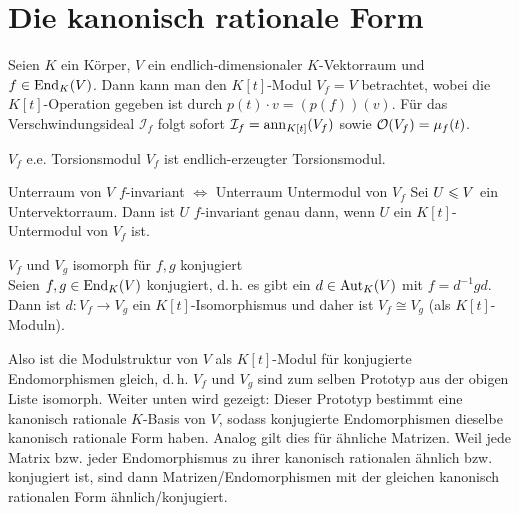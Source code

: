 \section{%
    Die kanonisch rationale Form%
}

\begin{Bem}
    Seien $K$ ein Körper, $V$ ein endlich-dimensionaler $K$-Vektorraum und
    $f \in \operatorname{End}_K(V)$.
    Dann kann man den $K[t]$-Modul $V_f = V$ betrachtet, wobei die
    $K[t]$-Operation gegeben ist durch $p(t) \cdot v = (p(f))(v)$.
    Für das Verschwindungsideal $\mathcal{I}_f$ folgt sofort
    $\mathcal{I}_f = \operatorname{ann}_{K[t]}(V_f)$ sowie $\mathcal{O}(V_f) = \mu_f(t)$.
\end{Bem}

\begin{Lemma}{$V_f$ e.e. Torsionsmodul}
    $V_f$ ist endlich-erzeugter Torsionsmodul.
\end{Lemma}

\begin{Lemma}{Unterraum von $V$ $f$-invariant $\Leftrightarrow$
              Unterraum Untermodul von $V_f$}
    Sei $U \leqslant V$ ein Untervektorraum.
    Dann ist $U$ $f$-invariant genau dann, wenn $U$ ein $K[t]$-Untermodul
    von $V_f$ ist.
\end{Lemma}

\begin{Satz}{$V_f$ und $V_g$ isomorph für $f, g$ konjugiert} \\
    Seien $f, g \in \operatorname{End}_K(V)$ konjugiert, d.\,h. es gibt ein
    $d \in \operatorname{Aut}_K(V)$ mit $f = d^{-1} g d$. \\
    Dann ist $d: V_f \rightarrow V_g$ ein $K[t]$-Isomorphismus und daher ist
    $V_f \cong V_g$ (als $K[t]$-Moduln).
\end{Satz}

\begin{Bem}
    Also ist die Modulstruktur von $V$ als $K[t]$-Modul für konjugierte
    Endomorphismen gleich, d.\,h. $V_f$ und $V_g$ sind zum selben Prototyp
    aus der obigen Liste isomorph.
    Weiter unten wird gezeigt:
    Dieser Prototyp bestimmt eine kanonisch rationale
    $K$-Basis von $V$, sodass konjugierte Endomorphismen dieselbe
    kanonisch rationale Form haben.
    Analog gilt dies für ähnliche Matrizen.
    Weil jede Matrix bzw. jeder Endomorphismus zu ihrer kanonisch rationalen
    ähnlich bzw. konjugiert ist, sind dann Matrizen/Endomorphismen mit der
    gleichen kanonisch rationalen Form ähnlich/konjugiert.
\end{Bem}

